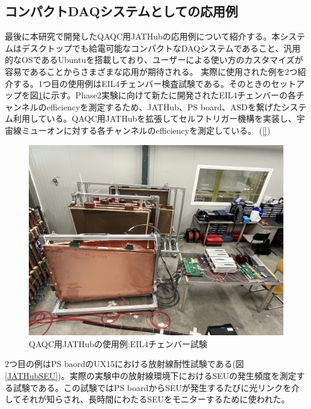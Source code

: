 \subsection{コンパクトDAQシステムとしての応用例}
\label{subsec_compactdaq}
最後に本研究で開発したQAQC用JATHubの応用例について紹介する。本システムはデスクトップでも給電可能なコンパクトなDAQシステムであること、汎用的なOSであるUbuntuを搭載しており、ユーザーによる使い方のカスタマイズが容易であることからさまざまな応用が期待される。
実際に使用された例を2つ紹介する。1つ目の使用例はEIL4チェンバー検査試験である。そのときのセットアップを図\ref{JATHubEIL4}に示す。Phase2実験に向けて新たに開発されたEIL4チェンバーの各チャンネルのefficiencyを測定するため、JATHub、PS board、ASDを繋げたシステム利用している。QAQC用JATHubを拡張してセルフトリガー機構を実装し、宇宙線ミューオンに対する各チャンネルのefficiencyを測定している。
\baselineskip(\ref{})

\begin{figure} 
\centering
\includegraphics[width=16cm]{fig/QAQC/JATHubEIL4.JPG}
\caption[QAQC用JATHubの使用例:EIL4チェンバー試験]{QAQC用JATHubの使用例:EIL4チェンバー試験\cite{mt_wada}}
\label{JATHubEIL4}
\end{figure}

2つ目の例はPS baordのUX15における放射線耐性試験である(図\ref{JATHubSEU})。実際の実験中の放射線環境下におけるSEUの発生頻度を測定する試験である。この試験ではPS boardからSEUが発生するたびに光リンクを介してそれが知らされ、長時間にわたるSEUをモニターするために使われた。

